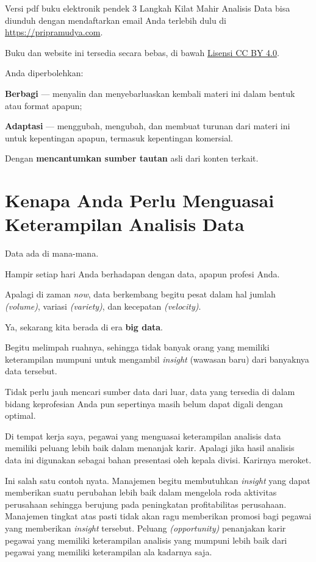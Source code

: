 \documentclass[openany]{book}
\begin{document}
Versi pdf buku elektronik pendek 3 Langkah Kilat Mahir Analisis Data
bisa diunduh dengan mendaftarkan email Anda terlebih dulu di
\url{https://pripramudya.com}.

Buku dan website ini tersedia secara bebas, di bawah
\href{https://creativecommons.org/licenses/by/4.0/deed.id}{Lisensi CC BY
4.0}.

Anda diperbolehkan:

\textbf{Berbagi} --- menyalin dan menyebarluaskan kembali materi ini
dalam bentuk atau format apapun;

\textbf{Adaptasi} --- menggubah, mengubah, dan membuat turunan dari
materi ini untuk kepentingan apapun, termasuk kepentingan komersial.

Dengan \textbf{mencantumkan sumber tautan} asli dari konten terkait.

\section*{Kenapa Anda Perlu Menguasai Keterampilan Analisis
Data}\label{kenapa-anda-perlu-menguasai-keterampilan-analisis-data}

Data ada di mana-mana.

Hampir setiap hari Anda berhadapan dengan data, apapun profesi Anda.

Apalagi di zaman \emph{now}, data berkembang begitu pesat dalam hal
jumlah \emph{(volume)}, variasi \emph{(variety)}, dan kecepatan
\emph{(velocity)}.

Ya, sekarang kita berada di era \textbf{big data}.

Begitu melimpah ruahnya, sehingga tidak banyak orang yang memiliki
keterampilan mumpuni untuk mengambil \emph{insight} (wawasan baru) dari
banyaknya data tersebut.

Tidak perlu jauh mencari sumber data dari luar, data yang tersedia di
dalam bidang keprofesian Anda pun sepertinya masih belum dapat digali
dengan optimal.

Di tempat kerja saya, pegawai yang menguasai keterampilan analisis data
memiliki peluang lebih baik dalam menanjak karir. Apalagi jika hasil
analisis data ini digunakan sebagai bahan presentasi oleh kepala divisi.
Karirnya meroket.

Ini salah satu contoh nyata. Manajemen begitu membutuhkan \emph{insight}
yang dapat memberikan suatu perubahan lebih baik dalam mengelola roda
aktivitas perusahaan sehingga berujung pada peningkatan profitabilitas
perusahaan. Manajemen tingkat atas pasti tidak akan ragu memberikan
promosi bagi pegawai yang memberikan \emph{insight} tersebut. Peluang
\emph{(opportunity)} penanjakan karir pegawai yang memiliki keterampilan
analisis yang mumpuni lebih baik dari pegawai yang memiliki keterampilan
ala kadarnya saja.
\end{document}
